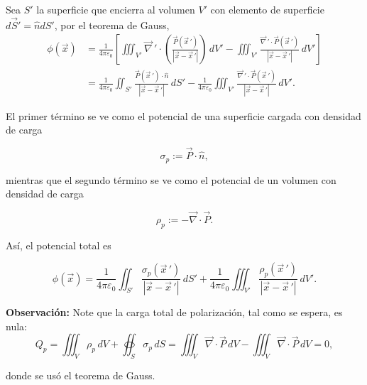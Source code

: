 Sea $S'$ la superficie que encierra al volumen $V'$ con elemento de superficie $d\Vec{S}' = \hat{n} dS'$, por el teorema de Gauss,
\begin{align*}
    \phi(\Vec{x}) &= \frac{1}{4\pi\varepsilon_0} \left[ \iiint_{V'} \Vec{\nabla}\,' \cdot \left( \frac{\Vec{P}(\vec{x}\,')}{|\Vec{x} - \Vec{x}\,'|} \right) \,dV' -  \iiint_{V'} \frac{\Vec{\nabla}\,' \cdot \Vec{P}(\Vec{x}\,')}{|\Vec{x} - \Vec{x}\,'|} \,dV'\right] \\
    &= \frac{1}{4\pi \varepsilon_0} \iint_{S'}  \frac{\Vec{P}(\vec{x}\,') \cdot \hat{n}}{|\Vec{x} - \Vec{x}\,'|} \,dS' - \frac{1}{4\pi \varepsilon_0} \iiint_{V'} \frac{\Vec{\nabla}\,' \cdot \Vec{P}(\Vec{x}\,')}{|\Vec{x} - \Vec{x}\,'|} \,dV'.
\end{align*}

El primer término se ve como el potencial de una superficie cargada con densidad de carga
\begin{shaded}
    $$\sigma_p := \vec{P} \cdot \hat{n},$$
\end{shaded}

mientras que el segundo término se ve como el potencial de un volumen con densidad de carga
\begin{shaded}
    $$\rho_p := - \Vec{\nabla} \cdot \Vec{P}.$$
\end{shaded}

Así, el potencial total es 
\begin{shaded}
    $$\phi(\Vec{x}) = \frac{1}{4\pi \varepsilon_0} \iint_{S'}  \frac{\sigma_p(\vec{x}\,')}{|\Vec{x} - \Vec{x}\,'|} \,dS' + \frac{1}{4\pi \varepsilon_0} \iiint_{V'} \frac{\rho_p(\Vec{x}\,')}{|\Vec{x} - \Vec{x}\,'|} \,dV'.$$
\end{shaded}


\textbf{Observación:} Note que la carga total de polarización, tal como se espera, es nula:
$$Q_p = \iiint_V \rho_p \,dV + \oiint_{S} \sigma_p \,dS = \iiint_V \Vec{\nabla} \cdot \Vec{P} \,dV - \iiint_{V} \Vec{\nabla} \cdot \Vec{P}  \,dV = 0,$$

donde se usó el teorema de Gauss.

